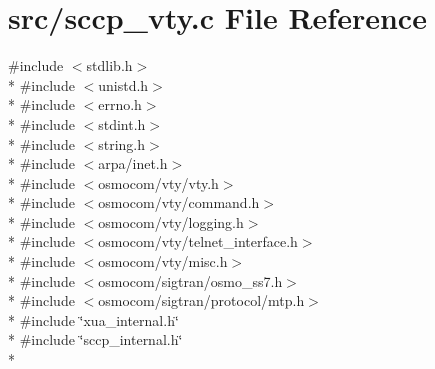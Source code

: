 \section{src/sccp\+\_\+vty.c File Reference}
\label{sccp__vty_8c}
{\ttfamily \#include $<$stdlib.\+h$>$}\\*
{\ttfamily \#include $<$unistd.\+h$>$}\\*
{\ttfamily \#include $<$errno.\+h$>$}\\*
{\ttfamily \#include $<$stdint.\+h$>$}\\*
{\ttfamily \#include $<$string.\+h$>$}\\*
{\ttfamily \#include $<$arpa/inet.\+h$>$}\\*
{\ttfamily \#include $<$osmocom/vty/vty.\+h$>$}\\*
{\ttfamily \#include $<$osmocom/vty/command.\+h$>$}\\*
{\ttfamily \#include $<$osmocom/vty/logging.\+h$>$}\\*
{\ttfamily \#include $<$osmocom/vty/telnet\+\_\+interface.\+h$>$}\\*
{\ttfamily \#include $<$osmocom/vty/misc.\+h$>$}\\*
{\ttfamily \#include $<$osmocom/sigtran/osmo\+\_\+ss7.\+h$>$}\\*
{\ttfamily \#include $<$osmocom/sigtran/protocol/mtp.\+h$>$}\\*
{\ttfamily \#include \char`\"{}xua\+\_\+internal.\+h\char`\"{}}\\*
{\ttfamily \#include \char`\"{}sccp\+\_\+internal.\+h\char`\"{}}\\*
